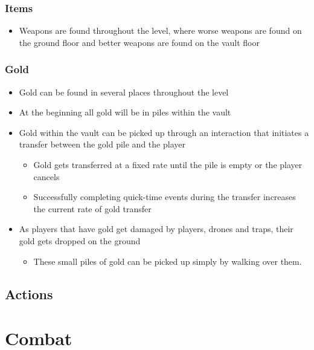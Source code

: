 \documentclass[14pts]{report}
\begin{document}
\subsubsection{Items}
\begin{itemize}
    \item Weapons are found throughout the level, where worse weapons are found on the ground floor and better weapons are found on the vault floor
\end{itemize}
\subsubsection{Gold}
\begin{itemize}
    \item Gold can be found in several places throughout the level
    \item At the beginning all gold will be in piles within the vault
    \item Gold within the vault can be picked up through an interaction that initiates a transfer between the gold pile and the player
    \begin{itemize}
        \item Gold gets transferred at a fixed rate until the pile is empty or the player cancels
        \item Successfully completing quick-time events during the transfer increases the current rate of gold transfer
    \end{itemize}
    \item As players that have gold get damaged by players, drones and traps, their gold gets dropped on the ground
    \begin{itemize}
        \item These small piles of gold can be picked up simply by walking over them.
    \end{itemize}
\end{itemize}
\subsection{Actions}

\section{Combat}
\end{document}
